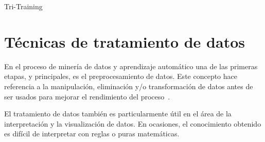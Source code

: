 \begin{algorithm}
    \DontPrintSemicolon
     \caption{Tri-Training}\label{pseudo:tri-training}
\end{algorithm}
\clearpage

\section{Técnicas de tratamiento de datos}

En el proceso de minería de datos y aprendizaje automático una de las primeras
etapas, y principales, es el preprocesamiento de datos. Este concepto hace
referencia a la manipulación,  eliminación y/o transformación de datos antes de
ser usados para mejorar el rendimiento del proceso~\cite{enwiki:1138293751}.

El tratamiento de datos también es particularmente útil en el área de la
interpretación y la visualización de datos. En ocasiones, el conocimiento
obtenido es difícil de interpretar con reglas o puras matemáticas.

